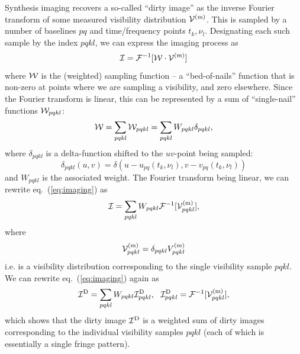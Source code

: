 \documentclass[useAMS,usenatbib]{mn2e}
\begin{document}
Synthesis imaging recovers a so-called ``dirty image'' as the inverse Fourier transform of some measured  
visibility distribution $\mathcal{V}^\mathrm{(m)}$. This is sampled by a number of baselines $pq$ and time/frequency points 
$t_k,\nu_l$. Designating each such sample by the index $pqkl$, we can express the imaging process as
\begin{equation}
\label{eq:imaging}
\mathcal{I} = \mathcal{F}^{-1}[ \mathcal{W}\cdot \mathcal{V}^\mathrm{(m)} ]  
\end{equation}
where $\mathcal{W}$ is the (weighted) sampling function -- a ``bed-of-nails'' function that is non-zero at points where we 
are sampling a visibility, and zero elsewhere. 
Since the Fourier transform is linear, this can be represented by a sum of  ``single-nail'' functions $\mathcal{W}_{pqkl}$:
\begin{equation}
\mathcal{W} = \sum_{pqkl} \mathcal{W}_{pqkl} = \sum_{pqkl} W_{pqkl} \delta_{pqkl},
\end{equation}
where $\delta_{pqkl}$ is a delta-function shifted to the $uv$-point being sampled:
\begin{equation}
\delta_{pqkl}(u,v) = \delta(u-u_{pq}(t_k,\nu_l),v-v_{pq}(t_k,\nu_l))
\end{equation}
and $W_{pqkl}$ is the 
associated weight. The Fourier transform being linear, we can rewrite eq.~(\ref{eq:imaging}) as 
\begin{equation}
\label{eq:imaging2}
\mathcal{I} = \sum_{pqkl} W_{pqkl} \mathcal{F}^{-1}[ \mathcal{V}^\mathrm{(m)}_{pqkl} ],
\end{equation}
where 
\begin{equation}
\label{eq:imaging2a}
\mathcal{V}^\mathrm{(m)}_{pqkl} = \delta_{pqkl} V^\mathrm{(m)}_{pqkl}
\end{equation}
i.e. is a visibility distribution corresponding to the single visibility sample $pqkl$. We can rewrite eq.~(\ref{eq:imaging})
again as
\begin{equation}
\label{eq:imaging3}
\mathcal{I}^\mathrm{D} =  \sum_{pqkl} W_{pqkl} \mathcal{I}^\mathrm{D}_{pqkl},~~
\mathcal{I}^\mathrm{D}_{pqkl} =  \mathcal{F}^{-1}[ \mathcal{V}^\mathrm{(m)}_{pqkl} ],
\end{equation}
which shows that the dirty image $\mathcal{I}^\mathrm{D}$ is a weighted sum of dirty images corresponding to the individual visibility 
samples $pqkl$ (each of which is essentially a single fringe pattern).
\end{document}
